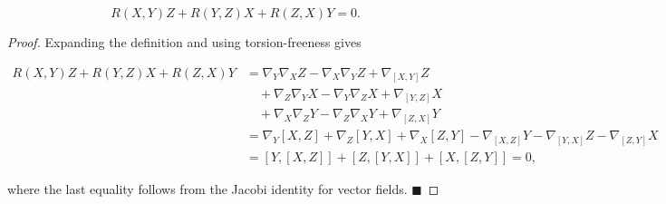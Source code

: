 \begin{proposition}
  \label{prop:dc-ch4-2-4}
  \leanok
  $$
  R(X,Y)Z+R(Y,Z)X+R(Z,X)Y=0.
  $$
\end{proposition}
\begin{proof}
  \leanok
  \sketch
  Expanding the definition and using torsion-freeness gives
  
  $$
  \begin{aligned}R(X,Y)Z+R(Y,Z)X+R(Z,X)Y&=\nabla_Y\nabla_X Z-\nabla_X\nabla_Y Z+\nabla_{[X,Y]}Z\\&\quad+\nabla_Z\nabla_Y X-\nabla_Y\nabla_Z X+\nabla_{[Y,Z]}X\\&\quad+\nabla_X\nabla_Z Y-\nabla_Z\nabla_X Y+\nabla_{[Z,X]}Y\\&=\nabla_Y[X,Z]+\nabla_Z[Y,X]+\nabla_X[Z,Y]-\nabla_{[X,Z]}Y-\nabla_{[Y,X]}Z-\nabla_{[Z,Y]}X\\&=[Y,[X,Z]]+[Z,[Y,X]]+[X,[Z,Y]]=0,\end{aligned}
  $$
  
  where the last equality follows from the Jacobi identity for vector fields.
  $\blacksquare$
\end{proof}

